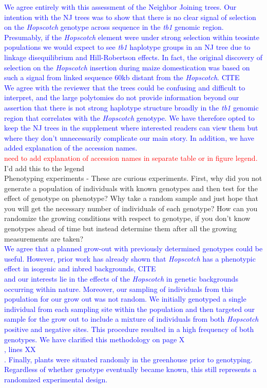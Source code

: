 \documentclass[11pt]{article}
\newcommand{\res}[1]{\noindent \textcolor{blue}{{#1}} \\}
\newcommand{\jri}[1]{\noindent \textcolor{red}{{#1}} \\}
\newcommand{\mbh}[1]{\noindent \textcolor{Dandelion}{{#1}}\\}
\begin{document}
\res{We agree entirely with this assessment of the Neighbor Joining trees. 
Our intention with the NJ trees was to show that there is no clear signal of selection on the \emph{Hopscotch} genotype across sequence in the \emph{tb1} genomic region.
Presumably, if the \emph{Hopscotch} element were under strong selection within teosinte populations we would expect to see \emph{tb1} haplotype groups in an NJ tree due to linkage disequilibrium and Hill-Robertson effects.
In fact, the original discovery of selection on the \emph{Hopscotch} insertion during maize domestication was based on such a signal from linked sequence 60kb distant from the \emph{Hopscotch}. \mbh{CITE} 
We agree with the reviewer that the trees could be confusing and difficult to interpret, and the large polytomies do not provide information beyond our assertion that there is not strong haplotype structure broadly in the \emph{tb1} genomic region that correlates with the \emph{Hopscotch} genotype.
We have therefore opted to keep the NJ trees in the supplement where interested readers can view them but where they don't unnecessarily complicate our main story.
In addition, we have added explanation of the accession names.}

\jri{need to add explanation of accession names in separate table or in figure legend.} \mbh{I'd add this to the legend}

Phenotyping experiments - These are curious experiments.  First, why did you not generate a population of individuals with known genotypes and then test for the effect of genotype on phenotype?  Why take a random sample and just hope that you will get the necessary number of individuals of each genotype?  How can you randomize the growing conditions with respect to genotype, if you don't know genotypes ahead of time but instead determine them after all the growing measurements are taken?\\

\res{We agree that a planned grow-out with previously determined genotypes could be useful.  
However, prior work has already shown that \emph{Hopscotch} has a phenotypic effect in isogenic and inbred backgrounds, \mbh{CITE} and our interests lie in the effects of the \emph{Hopscotch} in genetic backgrounds occurring within nature.
Moreover, our sampling of individuals from this population for our grow out was not random.  
We initially genotyped a single individual from each sampling site within the population and then targeted our sample for the grow out to include a mixture of individuals from both \emph{Hopscotch} positive and negative sites.  
This procedure resulted in a high frequency of both genotypes.
We have clarified this methodology on page \mbh{X}, lines \mbh{XX}.
Finally, plants were situated randomly in the greenhouse prior to genotyping.
Regardless of whether genotype eventually became known, this still represents a randomized experimental design.}
\end{document}
